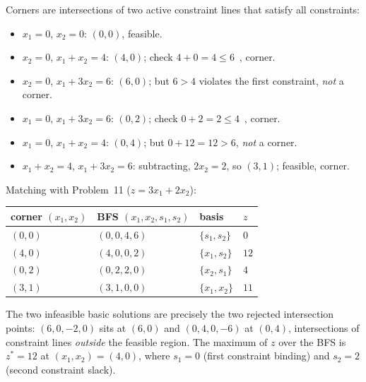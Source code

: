 \begin{solutions}
  \item Corners are intersections of two active constraint lines that
        satisfy all constraints:
        \begin{itemize}[leftmargin=1.8em,itemsep=0.3ex]
          \item $x_{1}=0$, $x_{2}=0$: $(0,0)$, feasible.
          \item $x_{2}=0$, $x_{1}+x_{2}=4$: $(4,0)$; check
                $4+0=4\le 6$~\checkmark, corner.
          \item $x_{2}=0$, $x_{1}+3x_{2}=6$: $(6,0)$; but $6>4$ violates
                the first constraint, \emph{not} a corner.
          \item $x_{1}=0$, $x_{1}+3x_{2}=6$: $(0,2)$; check
                $0+2=2\le 4$~\checkmark, corner.
          \item $x_{1}=0$, $x_{1}+x_{2}=4$: $(0,4)$; but
                $0+12=12>6$, \emph{not} a corner.
          \item $x_{1}+x_{2}=4$, $x_{1}+3x_{2}=6$: subtracting,
                $2x_{2}=2$, so $(3,1)$; feasible, corner.
        \end{itemize}
        Matching with Problem~11 ($z=3x_{1}+2x_{2}$):
        \begin{center}
        \begin{tabular}{llll}
          \hline
          corner $(x_{1},x_{2})$ & BFS $(x_{1},x_{2},s_{1},s_{2})$ &
          basis & $z$\\
          \hline
          $(0,0)$ & $(0,0,4,6)$ & $\{s_{1},s_{2}\}$ & $0$\\
          $(4,0)$ & $(4,0,0,2)$ & $\{x_{1},s_{2}\}$ & $12$\\
          $(0,2)$ & $(0,2,2,0)$ & $\{x_{2},s_{1}\}$ & $4$\\
          $(3,1)$ & $(3,1,0,0)$ & $\{x_{1},x_{2}\}$ & $11$\\
          \hline
        \end{tabular}
        \end{center}
        The two infeasible basic solutions are precisely the two rejected
        intersection points: $(6,0,-2,0)$ sits at $(6,0)$ and
        $(0,4,0,-6)$ at $(0,4)$, intersections of constraint lines
        \emph{outside} the feasible region. The maximum of $z$ over the
        BFS is $z^{*}=12$ at $(x_{1},x_{2})=(4,0)$, where $s_{1}=0$ (first
        constraint binding) and $s_{2}=2$ (second constraint slack).


\end{solutions}
